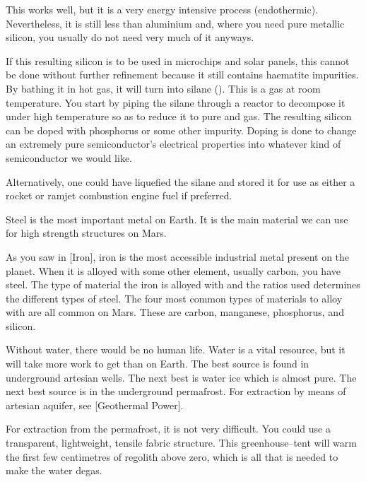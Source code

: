 \startformula
{}
\stopformula

This works well, but it is a very energy intensive process (endothermic). Nevertheless, it is still less than aluminium and, where you need pure metallic silicon, you usually do not need very much of it anyways. 

If this resulting silicon is to be used in microchips and solar panels, this cannot be done without further refinement because it still contains haematite impurities. By bathing it in hot  gas, it will turn into silane (). This is a gas at room temperature. You start by piping the silane through a reactor to decompose it under high temperature so as to reduce it to pure  and  gas. The resulting silicon can be doped with phosphorus or some other impurity. Doping is done to change an extremely pure semiconductor's electrical properties into whatever kind of semiconductor we would like.

Alternatively, one could have liquefied the silane and stored it for use as either a rocket or ramjet combustion engine fuel if preferred.

Steel is the most important metal on Earth. It is the main material we can use for high strength structures on Mars.

As you saw in [Iron], iron is the most accessible industrial metal present on the planet. When it is alloyed with some other element, usually carbon, you have steel. The type of material the iron is alloyed with and the ratios used determines the different types of steel. The four most common types of materials to alloy with are all common on Mars. These are carbon, manganese, phosphorus, and silicon.

Without water, there would be no human life. Water is a vital resource, but it will take more work to get than on Earth. The best source is found in underground artesian wells. The next best is water ice which is almost pure. The next best source is in the underground permafrost. For extraction by means of artesian aquifer, see [Geothermal Power].

For extraction from the permafrost, it is not very difficult. You could use a transparent, lightweight, tensile fabric structure. This greenhouse--tent will warm the first few centimetres of regolith above zero, which is all that is needed to make the water degas. 

